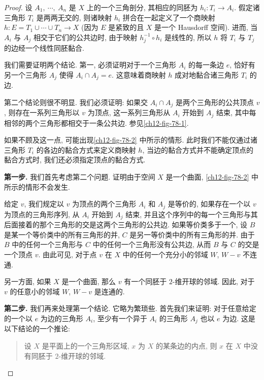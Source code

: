 \begin{proof}
设 $A_{1},\ \cdots,\ A_{n}$ 是 $X$ 上的一个三角剖分, 其相应的同胚为 $h_{i}\colon T_{i}\to A_{i}$. 假定诸三角形 $T_{i}$ 是两两无交的, 则诸映射 $h_{i}$ 拼合在一起定义了一个商映射 $h\colon E=T_{1}\cup\cdots\cup T_{n}\to X$ (因为 $E$ 是紧致的且 $X$ 是一个 Hausdorff 空间). 进而, 当 $A_{i}$ 与 $A_{j}$ 相交于它们的公共边时, 由于映射 $h_{j}^{-1}\circ h_{i}$ 是线性的, 所以 $h$ 将 $T_{i}$ 与 $T_{j}$ 的边经一个线性同胚黏合.

我们需要证明两个结论. 第一, 必须证明对于一个三角形 $A_{i}$ 的每一条边 $e$, 恰好有另一个三角形 $A_{j}$ 使得 $A_{i}\cap A_{j}=e$. 这意味着商映射 $h$ 成对地黏合诸三角形 $T_{i}$ 的边.

第二个结论则很不明显. 我们必须证明: 如果交 $A_{i}\cap A_{j}$ 是两个三角形的公共顶点 $v$, 则存在一系列三角形以 $v$ 为顶点, 这一系列三角形从 $A_{i}$ 开始到 $A_{j}$ 结束, 其中每相邻的两个三角形都相交于一条公共边. 参见\cref{ch12-fig-78-1}.

如果不顾及这一点, 可能出现\cref{ch12-fig-78-2} 中所示的情形. 此时我们不能仅通过诸三角形 $T_{i}$ 的各边的黏合方式来定义商映射 $h$, 当边的黏合方式并不能确定顶点的黏合方式时, 我们还必须指定顶点的黏合方式.



\textbf{第一步.} 我们首先考虑第二个问题. 证明由于空间 $X$ 是一个曲面, \cref{ch12-fig-78-2} 中所示的情形不会发生.

给定 $v$, 我们规定以 $v$ 为顶点的两个三角形 $A_{i}$ 和 $A_{j}$ 是等价的, 如果存在一个以 $v$ 为顶点的三角形序列, 从 $A_{i}$ 开始到 $A_{j}$ 结束, 并且这个序列中的每一个三角形与其后面接着的那个三角形的交是这两个三角形的公共边. 如果等价类多于一个, 设 $B$ 是某一个等价类中的所有三角形的并, $C$ 是另一等价类中的所有三角形的并. 由于 $B$ 中的任何一个三角形与 $C$ 中的任何一个三角形没有公共边, 从而 $B$ 与 $C$ 的交是一个顶点 $v$. 由此可见, 对于点 $v$ 在 $X$ 中的任何一个充分小的邻域 $W$, $W-v$ 不连通.

另一方面, 如果 $X$ 是一个曲面, 那么 $v$ 有一个同胚于 $2$-维开球的邻域. 因此, 对于 $v$ 的任意小的邻域 $W$, $W-v$ 是连通的.

\textbf{第二步.} 我们再来处理第一个结论. 它略为繁琐些. 首先我们来证明: 对于任意给定的一个以 $e$ 为边的三角形 $A_{i}$, 至少有一个异于 $A_{i}$ 的三角形 $A_{j}$ 也以 $e$ 为边. 这是以下结论的一个推论:

\begin{quote}
设 $X$ 是平面上的一个三角形区域, $x$ 为 $X$ 的某条边的内点, 则 $x$ 在 $X$ 中没有同胚于 $2$-维开球的邻域.
\end{quote}


\end{proof}
